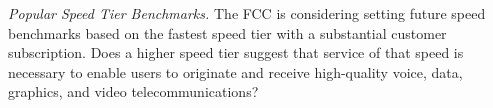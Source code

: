
%

 \emph{Popular Speed Tier Benchmarks.} The FCC is considering setting future speed benchmarks based on the fastest speed tier with a substantial customer subscription. Does a higher speed tier suggest that service of that speed is necessary to enable users to originate and receive high-quality voice, data, graphics, and video telecommunications?


